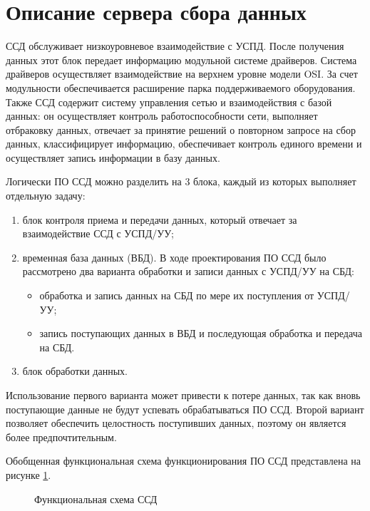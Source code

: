 \newpage
\section{Описание сервера сбора данных}
\setcounter{figure}{0}

ССД обслуживает низкоуровневое взаимодействие с УСПД. После получения данных этот блок передает информацию модульной системе драйверов. Система драйверов осуществляет взаимодействие на верхнем уровне модели OSI. За счет модульности обеспечивается расширение парка поддерживаемого оборудования. Также ССД содержит систему управления сетью и взаимодействия с базой данных: он осуществляет контроль работоспособности сети, выполняет отбраковку данных, отвечает за принятие решений о повторном запросе на сбор данных, классифицирует информацию, обеспечивает контроль единого времени и осуществляет запись информации в базу данных.

Логически ПО ССД можно разделить на 3 блока, каждый из которых выполняет отдельную задачу:
\begin{enumerate}
\item блок контроля приема и передачи данных, который отвечает за взаимодействие ССД с УСПД/УУ;
\item временная база данных (ВБД). В ходе проектирования ПО ССД было рассмотрено два варианта обработки и записи данных с УСПД/УУ на СБД: 
\begin{itemize}
\item обработка и запись данных на СБД по мере их поступления от УСПД/УУ;
\item запись поступающих данных в ВБД и последующая обработка и передача на СБД.
\end{itemize}
\item блок обработки данных.
\end{enumerate}

Использование первого варианта может привести к потере данных, так как вновь поступающие данные не будут успевать обрабатываться ПО ССД. Второй вариант позволяет обеспечить целостность поступивших данных, поэтому он является более предпочтительным.

Обобщенная функциональная схема функционирования ПО ССД представлена на рисунке \ref{sh_ssd:sh_ssd}.

\begin{figure}[h!]
 \caption{Функциональная схема ССД}
 \label{sh_ssd:sh_ssd}
\end{figure}
